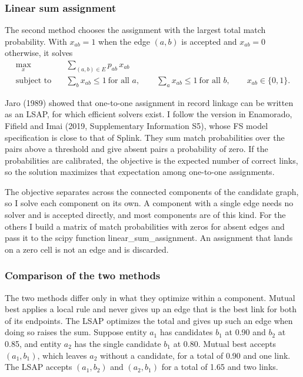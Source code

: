 \documentclass[11pt]{article}
\begin{document}
\subsubsection*{Linear sum assignment}

The second method chooses the assignment with the largest total match probability. With $x_{ab} = 1$ when the edge $(a, b)$ is accepted and $x_{ab} = 0$ otherwise, it solves
\[
\begin{aligned}
\max_{x}\quad & \sum_{(a, b) \in E} p_{ab}\, x_{ab} \\
\text{subject to}\quad & \sum_{b} x_{ab} \le 1 \ \text{for all } a, \qquad \sum_{a} x_{ab} \le 1 \ \text{for all } b, \qquad x_{ab} \in \{0, 1\}.
\end{aligned}
\]

Jaro (1989) showed that one-to-one assignment in record linkage can be written as an LSAP, for which efficient solvers exist. I follow the version in Enamorado, Fifield and Imai (2019, Supplementary Information S5), whose FS model specification is close to that of Splink. They sum match probabilities over the pairs above a threshold and give absent pairs a probability of zero. If the probabilities are calibrated, the objective is the expected number of correct links, so the solution maximizes that expectation among one-to-one assignments.

The objective separates across the connected components of the candidate graph, so I solve each component on its own. A component with a single edge needs no solver and is accepted directly, and most components are of this kind. For the others I build a matrix of match probabilities with zeros for absent edges and pass it to the scipy function linear\_sum\_assignment. An assignment that lands on a zero cell is not an edge and is discarded.

\subsubsection*{Comparison of the two methods}

The two methods differ only in what they optimize within a component. Mutual best applies a local rule and never gives up an edge that is the best link for both of its endpoints. The LSAP optimizes the total and gives up such an edge when doing so raises the sum. Suppose entity $a_1$ has candidates $b_1$ at 0.90 and $b_2$ at 0.85, and entity $a_2$ has the single candidate $b_1$ at 0.80. Mutual best accepts $(a_1, b_1)$, which leaves $a_2$ without a candidate, for a total of 0.90 and one link. The LSAP accepts $(a_1, b_2)$ and $(a_2, b_1)$ for a total of 1.65 and two links.
\end{document}
